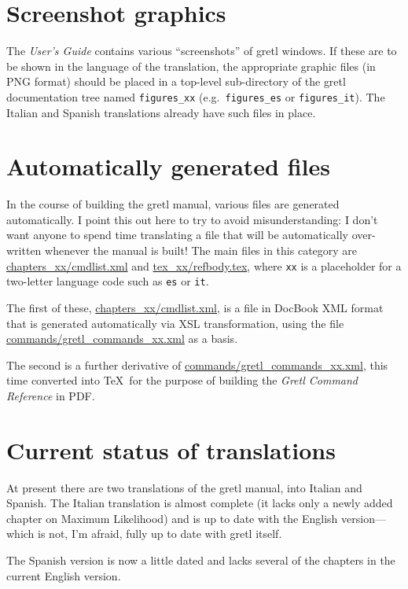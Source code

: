 \documentclass{article}
\begin{document}
\section{Screenshot graphics}

The \textit{User's Guide} contains various ``screenshots'' of
\textsf{gretl} windows.  If these are to be shown in the language of
the translation, the appropriate graphic files (in \textsf{PNG}
format) should be placed in a top-level sub-directory of the
\textsf{gretl} documentation tree named \texttt{figures\_xx} (e.g.\ 
\texttt{figures\_es} or \texttt{figures\_it}).  The Italian and
Spanish translations already have such files in place.

\section{Automatically generated files}

In the course of building the gretl manual, various files are
generated automatically.  I point this out here to try to avoid
misunderstanding: I don't want anyone to spend time translating a
file that will be automatically over-written whenever the manual is
built!  The main files in this category are
%
\url{chapters_xx/cmdlist.xml}
%
and
%
\url{tex_xx/refbody.tex},
%
where \texttt{xx} is a placeholder for a two-letter language code
such as \texttt{es} or \texttt{it}.  

The first of these, \url{chapters_xx/cmdlist.xml}, is a file in
DocBook XML format that is generated automatically via XSL
transformation, using the file \url{commands/gretl_commands_xx.xml} as
a basis.  

The second is a further derivative of
\url{commands/gretl_commands_xx.xml}, this time converted into \TeX\ 
for the purpose of building the \textit{Gretl Command Reference} in
PDF.

\section{Current status of translations}

At present there are two translations of the \textsf{gretl} manual,
into Italian and Spanish.  The Italian translation is almost complete
(it lacks only a newly added chapter on Maximum Likelihood) and is up
to date with the English version---which is not, I'm afraid, fully up
to date with \textsf{gretl} itself.

The Spanish version is now a little dated and lacks several of the
chapters in the current English version.  
\end{document}
